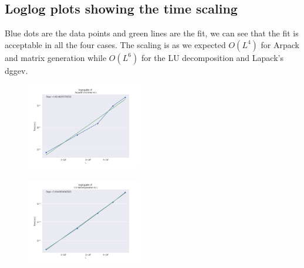 \documentclass[%
 reprint,
 amsmath,amssymb,
 aps,
]{revtex4-2}
\begin{document}



\subsection{Loglog plots showing the time scaling \label{appen::loglog_plots}}

Blue dots are the data points and green lines are the fit, we can see that the fit is acceptable in all the four cases. The scaling is as we expected $O(L^4)$ for Arpack and matrix generation while $O(L^6)$ for the LU decomposition and Lapack's dggev.

\begin{figure}[h]
  \centering
  \includegraphics[width=0.45\textwidth]{./images/arpack_loglog.png}
\end{figure}

\begin{figure}[h]
  \centering
  \includegraphics[width=0.45\textwidth]{./images/lu_loglog.png}
\end{figure}
\end{document}
